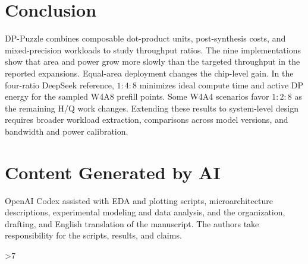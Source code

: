 \documentclass[conference,9pt,letterpaper]{IEEEtran}
\newcounter{DACreferencepage}
\begin{document}
\section{Conclusion}
\label{sec:conclusion}

DP-Puzzle combines composable dot-product units, post-synthesis costs, and mixed-precision workloads to study throughput ratios. The nine implementations show that area and power grow more slowly than the targeted throughput in the reported expansions. Equal-area deployment changes the chip-level gain. In the four-ratio DeepSeek reference, $1:4:8$ minimizes ideal compute time and active DP energy for the sampled W4A8 prefill points. Some W4A4 scenarios favor $1:2:8$ as the remaining H/Q work changes. Extending these results to system-level design requires broader workload extraction, comparisons across model versions, and bandwidth and power calibration.

\section*{Content Generated by AI}
OpenAI Codex assisted with EDA and plotting scripts, microarchitecture descriptions, experimental modeling and data analysis, and the organization, drafting, and English translation of the manuscript. The authors take responsibility for the scripts, results, and claims.

\clearpage
\setcounter{DACreferencepage}{\value{page}}
\ifnum\value{DACreferencepage}>7\relax
\fi
{}


\end{document}
